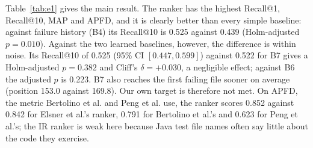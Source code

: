 \documentclass[10pt,conference]{IEEEtran}
\begin{document}
\begin{table}[t]
\caption{RQ2: Ranking Failing Test Files on the 148 Chronological Test Instances (Median 595 Candidate Files per Instance)}
\label{tab:e1}
\centering
\scriptsize
\setlength{\tabcolsep}{2.6pt}
\end{table}

Table~\ref{tab:e1} gives the main result. The ranker has the highest Recall@1, Recall@10, MAP and APFD, and it is clearly better than every simple baseline: against failure history (B4) its Recall@10 is 0.525 against 0.439 (Holm-adjusted $p=0.010$). Against the two learned baselines, however, the difference is within noise. Its Recall@10 of 0.525 (95\% CI $[0.447, 0.599]$) against 0.522 for B7 gives a Holm-adjusted $p=0.382$ and Cliff's $\delta=+0.030$, a negligible effect; against B6 the adjusted $p$ is 0.223. B7 also reaches the first failing file sooner on average (position 153.0 against 169.8). Our own target is therefore not met. On APFD, the metric Bertolino et al. and Peng et al. use, the ranker scores 0.852 against 0.842 for Elsner et al.'s ranker, 0.791 for Bertolino et al.'s and 0.623 for Peng et al.'s; the IR ranker is weak here because Java test file names often say little about the code they exercise.
\end{document}

